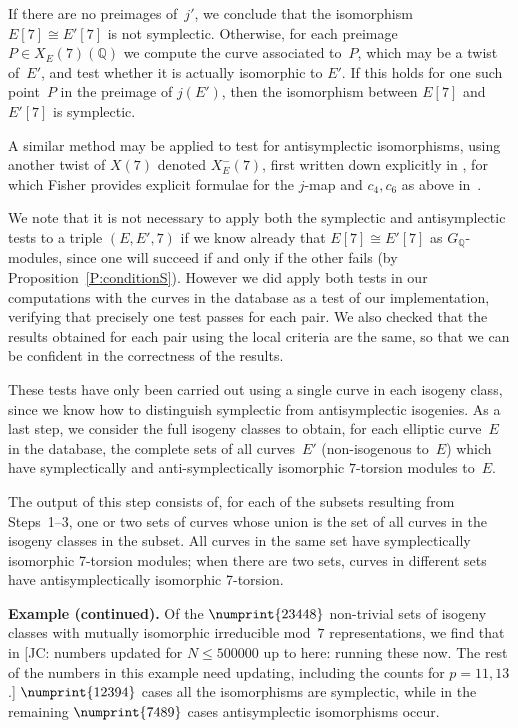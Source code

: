 \documentclass[12pt, reqno]{amsart}
\newcommand{\Q}{\mathbb{Q}}
\numberwithin{equation}{section}
\theoremstyle{definition}
\theoremstyle{remark}
\newcommand{\jc}[1]{{\color{darkgreen} \textsf{[JC: #1]}}}
\begin{document}
If there are no preimages of~$j'$, we conclude that the isomorphism
$E[7]\cong E'[7]$ is not symplectic.  Otherwise, for each preimage
$P\in X_E(7)(\Q)$ we compute the curve associated to~$P$, which may be
a twist of~$E'$, and test whether it is actually isomorphic to $E'$.
If this holds for one such point~$P$ in the preimage of $j(E')$, then
the isomorphism between $E[7]$ and $E'[7]$ is symplectic.

A similar method may be applied to test for antisymplectic
isomorphisms, using another twist of $X(7)$ denoted $X_E^-(7)$, first
written down explicitly in \cite{PSS}, for which Fisher provides
explicit formulae for the $j$-map and $c_4,c_6$ as above
in~\cite{Fisher}.

We note that it is not necessary to apply both the symplectic and
antisymplectic tests to a triple $(E,E',7)$ if we know already that
$E[7]\cong E'[7]$ as $G_\Q$-modules, since one will succeed if and only if the other
fails (by Proposition~\ref{P:conditionS}).  However we did apply both
tests in our computations with the curves in the database as a test of
our implementation, verifying that precisely one test passes for each
pair.  We also checked that the results obtained for each pair using
the local criteria are the same, so that we can be confident in the
correctness of the results.

These tests have only been carried out using a single curve in each
isogeny class, since we know how to distinguish symplectic from
antisymplectic isogenies.  As a last step, we consider the full isogeny classes
to obtain, for each elliptic curve~$E$ in the database, the complete sets of all curves~$E'$ (non-isogenous to~$E$) which have
symplectically and anti-symplectically isomorphic $7$-torsion modules to~$E$.

The output of this step consists of, for each of the subsets resulting
from Steps~1--3, one or two sets of curves whose union is the set of
all curves in the isogeny classes in the subset.  All curves in the
same set have symplectically isomorphic 7-torsion modules; when there
are two sets, curves in different sets have antisymplectically
isomorphic 7-torsion.




{\bf Example (continued).}
Of the $\numprint{23448}$ non-trivial sets of isogeny classes with mutually
isomorphic irreducible mod~$7$ representations, we find that in
\jc{numbers updated for $N\le500000$ up to here: running these now.  The rest of
the numbers in this example need updating, including the counts for $p=11,13$.}
$\numprint{12394}$ cases all the isomorphisms are symplectic, while in the
remaining $\numprint{7489}$ cases antisymplectic isomorphisms occur.
\end{document}
